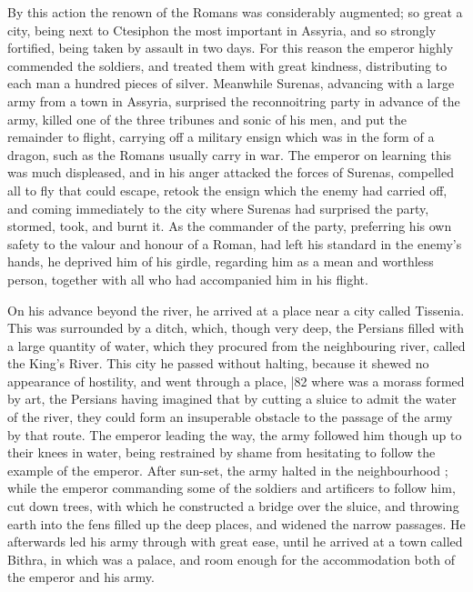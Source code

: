 By this action the renown of the Romans was considerably augmented; so great a city, being next to Ctesiphon the most important in Assyria, and so strongly fortified, being taken by assault in two days. For this reason the emperor highly commended the soldiers, and treated them with great kindness, distributing to each man a hundred pieces of silver. Meanwhile Surenas, advancing with a large army from a town in Assyria, surprised the reconnoitring party in advance of the army, killed one of the three tribunes and sonic of his men, and put the remainder to flight, carrying off a military ensign which was in the form of a dragon, such as the Romans usually carry in war. The emperor on learning this was much displeased, and in his anger attacked the forces of Surenas, compelled all to fly that could escape, retook the ensign which the enemy had carried off, and coming immediately to the city where Surenas had surprised the party, stormed, took, and burnt it. As the commander of the party, preferring his own safety to the valour and honour of a Roman, had left his standard in the enemy's hands, he deprived him of his girdle, regarding him as a mean and worthless person, together with all who had accompanied him in his flight.

On his advance beyond the river, he arrived at a place near a city called Tissenia. This was surrounded by a ditch, which, though very deep, the Persians filled with a large quantity of water, which they procured from the neighbouring river, called the King's River. This city he passed without halting, because it shewed no appearance of hostility, and went through a place,
|82 where was a morass formed by art, the Persians having imagined that by cutting a sluice to admit the water of the river, they could form an insuperable obstacle to the passage of the army by that route. The emperor leading the way, the army followed him though up to their knees in water, being restrained by shame from hesitating to follow the example of the emperor. After sun-set, the army halted in the neighbourhood ; while the emperor commanding some of the soldiers and artificers to follow him, cut down trees, with which he constructed a bridge over the sluice, and throwing earth into the fens filled up the deep places, and widened the narrow passages. He afterwards led his army through with great ease, until he arrived at a town called Bithra, in which was a palace, and room enough for the accommodation both of the emperor and his army.

